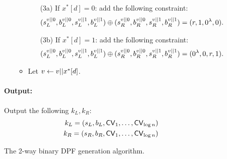 \begin{figure}[p]
\begin{minipage}{\textwidth}
\begin{mdframed}
\begin{itemize}[label={},leftmargin=*]
\begin{itemize}
\begin{enumerate}
\vspace{2pt}
                        \item[(3a)] If $x^*[d]=0$: add the following constraint: 
                        \begin{align*}
                            (s^{v||0}_L, b^{v||0}_L, s^{v||1}_L, b^{v||1}_L) \oplus (s^{v||0}_R, b^{v||0}_R, s^{v||1}_R, b^{v||1}_R) = (r, 1, 0^{\lambda}, 0).
                        \end{align*}
                        \item[(3b)] If $x^*[d]=1$: add the following constraint: 
                        \begin{align*}
                            (s^{v||0}_L, b^{v||0}_L, s^{v||1}_L, b^{v||1}_L) \oplus (s^{v||0}_R, b^{v||0}_R, s^{v||1}_R, b^{v||1}_R) = (0^{\lambda}, 0, r, 1).
                        \end{align*}
                    \end{enumerate}
                    \item Let $v\leftarrow v||x^*[d]$.
                \end{itemize}  
            \end{itemize}
            \paragraph{Output:} Output the following $k_L, k_R$:
            \begin{align*}
                k_L=(s_L, b_L, {\sf CV}_1,\dots,{\sf CV}_{\log n}) \\
                k_R=(s_R, b_R, {\sf CV}_1,\dots,{\sf CV}_{\log n})
            \end{align*}
            
        \end{mdframed}
    \end{minipage}
    \caption{The 2-way binary DPF generation algorithm.\label{fig:DPF}}
\label{fig:gen}
\end{figure}




